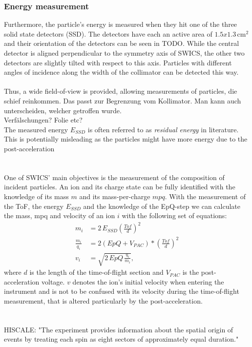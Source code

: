 \subsubsection{Energy measurement}
Furthermore, the particle's energy is measured when they hit one of the three solid state detectors (SSD). The detectors have each an active area of $1.5 x 1.3 \,\mathrm{cm^2}$ and their orientation of the detectors can be seen in TODO. While the central detector is aligned perpendicular to the symmetry axis of SWICS, the other two detectors are slightly tilted with respect to this axis. Particles with different angles of incidence along the width of the collimator can be detected this way.
\\ \\
Thus, a wide field-of-view is provided, allowing measurements of particles, die schief reinkommen. Das passt zur Begrenzung vom Kollimator. Man kann auch unterscheiden, welcher getroffen wurde.\\
Verfälschungen? Folie etc? \\ 
The measured energy $E_{SSD}$ is often referred to as \textit{residual energy} in literature. This is potentially misleading as the particles might have more energy due to the post-acceleration 
\\ \\ \\
One of SWICS' main objectives is the measurement of the composition of incident particles. An ion and its charge state can be fully identified with the knowledge of its mass $m$ and its mass-per-charge $mpq$. 
With the measurement of the ToF, the energy $E_{SSD}$ and the knowledge of the EpQ-step we can calculate the mass, mpq and velocity of an ion $i$ with the following set of equations:
\begin{align}
m_i &= 2\,E_{SSD} \left( \frac{Tof}{d}\right)^2 \label{eq:swics_set1}\\
\frac{m_i}{q_i} &= 2 \left(EpQ + V_{PAC}\right) * \left(\frac{Tof}{d}\right)^2 \label{eq:swics_set2} \\
v_i &= \sqrt{2\,EpQ\,\frac{q_i}{m_i}},
\label{eq:swics_set3}
\end{align}
where $d$ is the length of the time-of-flight section and $V_{PAC}$ is the post-acceleration voltage. $v$ denotes the ion's initial velocity when entering the instrument and is not to be confused with its velocity during the time-of-flight measurement, that is altered particularly by the post-acceleration.
\\ \\ \\HISCALE: "The experiment provides information about the spatial origin of events by treating each spin as eight sectors of approximately equal duration."





